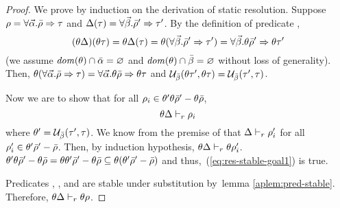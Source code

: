
\begin{proof}
  We prove by induction on the derivation of static resolution.
  Suppose $\rho = \forall \vec{\alpha}. \bar{\rho} \Rightarrow \tau$ and
  $\Delta(\tau) = \forall \vec{\beta}. \bar{\rho}' \Rightarrow \tau'$. By
  the definition of predicate \coherent{}, \\
  \begin{equation*}
    (\theta \Delta)(\theta \tau) = \theta \Delta(\tau) = \theta
    (\forall \vec{\beta}. \bar{\rho}' \Rightarrow \tau') = \forall \vec{\beta}. \theta
      \bar{\rho}' \Rightarrow \theta \tau'
  \end{equation*}
  (we assume ${\it dom }(\theta) \cap \bar{\alpha} = \varnothing$ and ${\it dom }(\theta)
  \cap \bar{\beta} = \varnothing$ without loss of generality). Then, $\theta
  (\forall \vec{\alpha}. \bar{\rho} \Rightarrow \tau) = \forall \vec{\alpha}. \theta
    \bar{\rho} \Rightarrow \theta \tau$ and 
  $\mathcal{U}_{\bar{\beta}}(\theta \tau', \theta \tau) =
  \mathcal{U}_{\bar{\beta}}(\tau', \tau)$.
  
  Now we are to show that for all $\rho_i \in \theta' \theta
  \bar{\rho}' - \theta \bar{\rho}$,
  \begin{equation}
    \label{eq:res-stable-goal1}
    \theta \Delta \vdash_{r} \rho_i
  \end{equation}
  where $\theta' = \mathcal{U}_{\bar{\beta}}(\tau', \tau)$. We know from
  the premise of \StaRes{} that $\Delta \vdash_{r} \rho_i'$ for all
  $\rho_i' \in \theta' \bar{\rho}' - \bar{\rho}$. Then, by
  induction hypothesis, $\theta \Delta \vdash_{r} \theta
  \rho_i'$. $\theta' \theta \bar{\rho}' - \theta \bar{\rho}
  = \theta \theta' \bar{\rho}' - \theta \bar{\rho} \subseteq \theta
  (\theta' \bar{\rho}' - \bar{\rho})$ and
  thus,~(\ref{eq:res-stable-goal1}) is true.

  Predicates \coherent{}, \disjoint{}, and \distinctctx{} are stable
  under substitution by~lemma \ref{aplem:pred-stable}. Therefore,
  $\theta \Delta \vdash_{r} \theta \rho$.
\end{proof}



